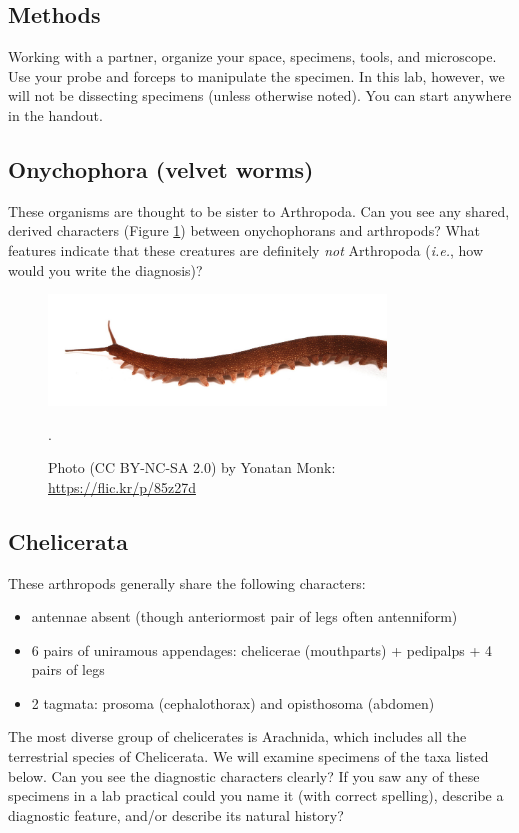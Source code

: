 \documentclass[letterpaper, 11pt]{article}
\begin{document}
\subsection*{Methods}
Working with a partner, organize your space, specimens, tools, and microscope. Use your probe and forceps to manipulate the specimen. In this lab, however, we will not be dissecting specimens (unless otherwise noted). You can start anywhere in the handout.

\subsection{Onychophora (velvet worms)}
These organisms are thought to be sister to Arthropoda. Can you see any shared, derived characters (Figure \ref{fig:onych}) between onychophorans and arthropods? What features indicate that these creatures are definitely \textit{not} Arthropoda (\textit{i.e.}, how would you write the diagnosis)? \vspace{3cm}

\begin{figure}[ht!]
  \centering
    \includegraphics[width=0.8\textwidth]{onych}
  \caption{Photo (CC BY-NC-SA 2.0) by Yonatan Monk: \url{https://flic.kr/p/85z27d}}.
  \label{fig:onych}
\end{figure}

\subsection{Chelicerata}
These arthropods generally share the following characters: 
\begin{itemize}
\item antennae absent (though anteriormost pair of legs often antenniform)
\item 6 pairs of uniramous appendages: chelicerae (mouthparts) + pedipalps + 4 pairs of legs
\item 2 tagmata: prosoma (cephalothorax) and opisthosoma (abdomen)
\end{itemize}
The most diverse group of chelicerates is Arachnida, which includes all the terrestrial species of Chelicerata. We will examine specimens of the taxa listed below. Can you see the diagnostic characters clearly? If you saw any of these specimens in a lab practical could you name it (with correct spelling), describe a diagnostic feature, and/or describe its natural history?
\end{document}
